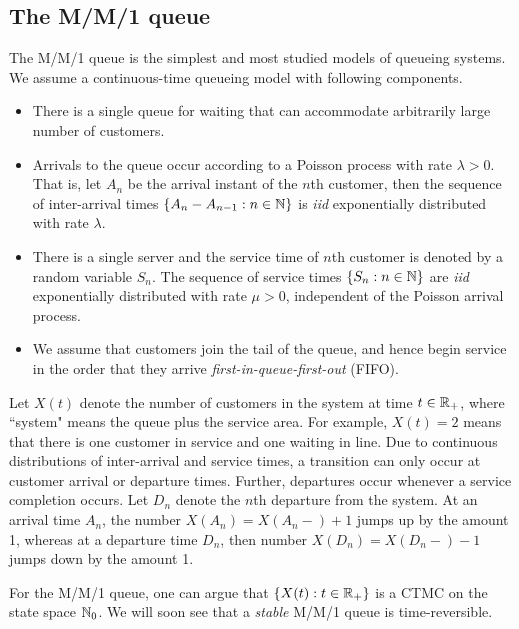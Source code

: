 \documentclass[a4paper,10pt,english]{article}
\begin{document}
\subsection{The M/M/1 queue}
The M/M/1 queue is the simplest and most studied models of queueing systems. 
We assume a continuous-time queueing model with following components. 
\begin{itemize}
\item There is a single queue for waiting that can accommodate arbitrarily large number of customers.  
\item Arrivals to the queue occur according to a Poisson process with rate $\lambda > 0$. 
That is, let $A_n$ be the arrival instant of the $n$th customer, then the sequence of inter-arrival times $\{A_{n}-A_{n-1} : n \in \mathbb{N}\}$ is \textit{iid} exponentially distributed with rate $\lambda$. 
\item There is a single server and the service time of $n$th customer is denoted by a random variable $S_n$. 
The sequence of service times $\{S_n: n \in \mathbb{N}\}$ are \textit{iid} exponentially distributed with rate $\mu > 0$, 
independent of the Poisson arrival process. 
\item We assume that customers join the tail of the queue, and hence begin service in the order that they arrive \textit{first-in-queue-first-out} (FIFO).
\end{itemize}
Let $X(t)$ denote the number of customers in the system at time $t \in \mathbb{R}_+$, 
where ``system" means the queue plus the service area. 
For example, $X(t) = 2$ means that there is one customer in service and one waiting in line. 
Due to continuous distributions of inter-arrival and service times, a transition can only occur at customer arrival or departure times. 
Further, departures occur whenever a service completion occurs. 
Let $D_n$ denote the $n$th departure from the system. 
At an arrival time $A_n$,  the number $X(A_n) = X(A_n-)+1$ jumps up by the amount 1, 
whereas at a departure time $D_n$, then number $X(D_n) = X(D_n-)-1$ jumps down by the amount 1. 





For the M/M/1 queue, one can argue that $\{X(t): t \in \mathbb{R}_+\}$ is a CTMC on the state space $\mathbb{N}_0$. 
We will soon see that a \textit{stable} M/M/1 queue is time-reversible.   
\end{document}
